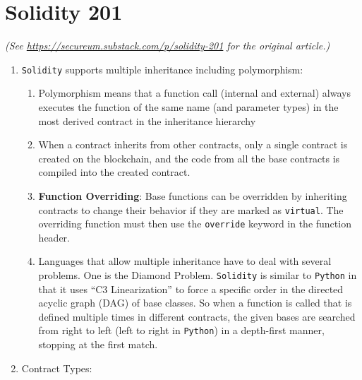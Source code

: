 \section{Solidity 201}

\textit{(See \url{https://secureum.substack.com/p/solidity-201} for the original article.)}\\

\begin{enumerate}

\item \verb|Solidity| supports multiple inheritance including polymorphism:

\begin{enumerate}
	\item Polymorphism means that a function call (internal and external) always executes the function of the same name (and parameter types) in the most derived contract in the inheritance hierarchy
	\item When a contract inherits from other contracts, only a single contract is created on the blockchain, and the code from all the base contracts is compiled into the created contract.
	\item\textbf{Function Overriding}: Base functions can be overridden by inheriting contracts to change their behavior if they are marked as \verb|virtual|. The overriding function must then use the \verb|override| keyword in the function header.
	\item Languages that allow multiple inheritance have to deal with several problems. One is the Diamond Problem. \verb|Solidity| is similar to \verb|Python| in that it uses “C3 Linearization” to force a specific order in the directed acyclic graph (DAG) of base classes. So when a function is called that is defined multiple times in different contracts, the given bases are searched from right to left (left to right in \verb|Python|) in a depth-first manner, stopping at the first match.
\end{enumerate}

\item Contract Types:


\end{enumerate}
